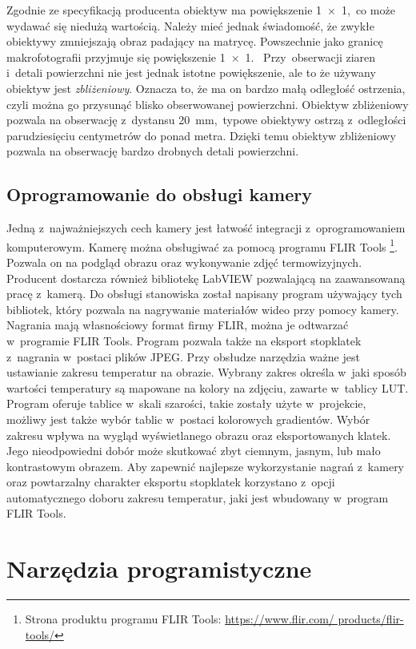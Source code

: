 Zgodnie ze specyfikacją producenta obiektyw ma powiększenie \num{1x1},~co może
wydawać się niedużą wartością.
Należy mieć jednak świadomość, że zwykłe obiektywy zmniejszają obraz padający na
matrycę.
Powszechnie jako granicę makrofotografii przyjmuje się powiększenie \num{1x1}.~%
Przy~obserwacji ziaren i~detali powierzchni nie jest jednak istotne
powiększenie, ale to że używany obiektyw jest \emph{zbliżeniowy}.
Oznacza to, że ma on bardzo małą odległość ostrzenia, czyli można go przysunąć
blisko obserwowanej powierzchni.
Obiektyw zbliżeniowy pozwala na obserwację z~dystansu
\SI{20}{\milli\meter},~typowe obiektywy ostrzą z~odległości parudziesięciu
centymetrów do ponad metra.
Dzięki temu obiektyw zbliżeniowy pozwala na obserwację bardzo drobnych detali
powierzchni.

\subsection{Oprogramowanie do obsługi kamery}
\label{subsec:camera_soft}
Jedną z~najważniejszych cech kamery jest łatwość integracji z~oprogramowaniem
komputerowym.
Kamerę można obsługiwać za pomocą programu FLIR Tools%
\footnote{%
    Strona produktu programu FLIR Tools:
    \url{https://www.flir.com/   products/flir-tools/}}.
Pozwala on na podgląd obrazu oraz wykonywanie zdjęć termowizyjnych.
Producent dostarcza również bibliotekę LabVIEW pozwalającą na zaawansowaną
pracę z~kamerą.
Do obsługi stanowiska został napisany program używający tych bibliotek, który
pozwala na nagrywanie materiałów wideo przy pomocy kamery.
Nagrania mają własnościowy format firmy FLIR, można je odtwarzać w~programie
FLIR Tools.
Program pozwala także na eksport stopklatek z~nagrania w~postaci plików JPEG.
Przy obsłudze narzędzia ważne jest ustawianie zakresu temperatur na obrazie.
Wybrany zakres określa w~jaki sposób wartości temperatury są mapowane na kolory
na zdjęciu, zawarte w~tablicy LUT.
Program oferuje tablice w~skali szarości, takie zostały użyte w~projekcie,
możliwy jest także wybór tablic w~postaci kolorowych gradientów.
Wybór zakresu wpływa na wygląd wyświetlanego obrazu oraz eksportowanych klatek.
Jego nieodpowiedni dobór może skutkować zbyt ciemnym, jasnym, lub mało
kontrastowym obrazem.
Aby zapewnić najlepsze wykorzystanie nagrań z~kamery oraz powtarzalny charakter
eksportu stopklatek korzystano z~opcji automatycznego doboru zakresu temperatur, 
jaki jest wbudowany w~program FLIR Tools.

\section{Narzędzia programistyczne}

